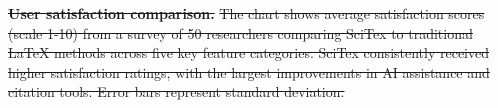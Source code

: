 \documentclass[preprint,review,12pt]{elsarticle}%
\providecommand{\DIFdeltex}[1]{{\protect\color{red}\sout{#1}}}                      %
\providecommand{\DIFdelFL}[1]{\DIFdel{#1}} %
\providecommand{\DIFdel}[1]{\texorpdfstring{\DIFdeltex{#1}}{}} %
\begin{document}
\begin{frontmatter}



{%
\textbf{\DIFdelFL{User satisfaction comparison.}} %
\DIFdelFL{The chart shows average satisfaction scores (scale 1-10) from a survey of 50 researchers comparing SciTex to traditional LaTeX methods across five key feature categories. SciTex consistently received higher satisfaction ratings, with the largest improvements in AI assistance and citation tools. Error bars represent standard deviation.}}


\end{frontmatter}
\end{document}
